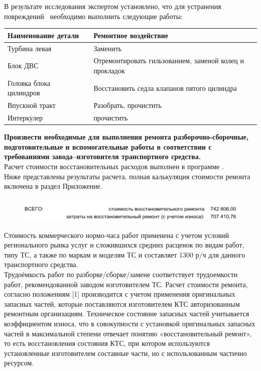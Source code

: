 %
%
%
В результате исследования   экспертом установлено, что для устранения повреждений  \, необходимо  выполнить следующие  работы:
\begin{center}
	\begin{tabulary}{\textwidth}{LCL}
\hline 
\textbf{Наименование детали}      &   & \textbf{Ремонтное воздействие}\\
\hline    
Турбина левая     &   &    Заменить\\
Блок ДВС    &   &    Отремонтировать гильзованием, заменой колец и прокладок \\
Головка блока цилиндров & & Восстановить седла клапанов пятого цилиндра \\
Впускной тракт & &    Разобрать, прочистить\\
Интеркулер   & &     прочистить\\
 

	\end{tabulary}  
\end{center}
\renewcommand\baselinestretch{1.2}\small\normalsize
%
\textbf{Произвести  необходимые для выполнения  ремонта разборочно-сборочные, подготовительные и вспомогательные работы в соответствии с требованиями завода–изготовителя транспортного средства.}\\
%
Расчет стоимости восстановительных расходов выполнен в программе \auda. \\ Ниже представлены результаты расчета, полная калькуляция стоимости ремонта включена в раздел Приложение.
\begin{figure}[H]
	\centering
	\includegraphics[width=0.8\linewidth]{images/Screenshot_2}
\end{figure}
\medskip
Стоимость коммерческого нормо-часа работ применена  с учетом условий регионального рынка услуг и сложившихся средних расценок по видам работ, типу ТС, а также по маркам и моделям ТС  и   составляет  1300 р/ч для данного транспортного средства. \\
Трудоёмкость работ по разборке/сборке/замене  соответствует трудоемкости работ, рекомендованной заводом изготовителем ТС. 
Расчет стоимости ремонта, согласно положениям [1] производится с учетом  применения оригинальных запасных частей, которые поставляются изготовителем КТС авторизованным ремонтным организациям. Техническое состояние запасных частей учитывается коэффициентом износа, что в совокупности с установкой оригинальных запасных частей в максимальной степени отвечает понятию «восстановительный ремонт», то есть восстановления состояния КТС, при котором используются установленные изготовителем составные части, но с использованным частично ресурсом. 

